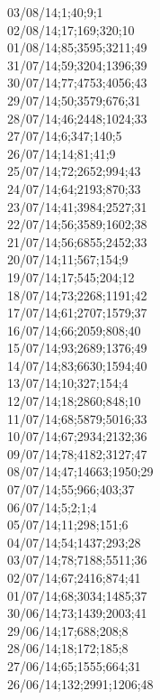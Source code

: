 03/08/14;1;40;9;1 \\
02/08/14;17;169;320;10 \\
01/08/14;85;3595;3211;49 \\
31/07/14;59;3204;1396;39 \\
30/07/14;77;4753;4056;43 \\
29/07/14;50;3579;676;31 \\
28/07/14;46;2448;1024;33 \\
27/07/14;6;347;140;5 \\
26/07/14;14;81;41;9 \\
25/07/14;72;2652;994;43 \\
24/07/14;64;2193;870;33 \\
23/07/14;41;3984;2527;31 \\
22/07/14;56;3589;1602;38 \\
21/07/14;56;6855;2452;33 \\
20/07/14;11;567;154;9 \\
19/07/14;17;545;204;12 \\
18/07/14;73;2268;1191;42 \\
17/07/14;61;2707;1579;37 \\
16/07/14;66;2059;808;40 \\
15/07/14;93;2689;1376;49 \\
14/07/14;83;6630;1594;40 \\
13/07/14;10;327;154;4 \\
12/07/14;18;2860;848;10 \\
11/07/14;68;5879;5016;33 \\
10/07/14;67;2934;2132;36 \\
09/07/14;78;4182;3127;47 \\
08/07/14;47;14663;1950;29 \\
07/07/14;55;966;403;37 \\
06/07/14;5;2;1;4 \\
05/07/14;11;298;151;6 \\
04/07/14;54;1437;293;28 \\
03/07/14;78;7188;5511;36 \\
02/07/14;67;2416;874;41 \\
01/07/14;68;3034;1485;37 \\
30/06/14;73;1439;2003;41 \\
29/06/14;17;688;208;8 \\
28/06/14;18;172;185;8 \\
27/06/14;65;1555;664;31 \\
26/06/14;132;2991;1206;48 \\
